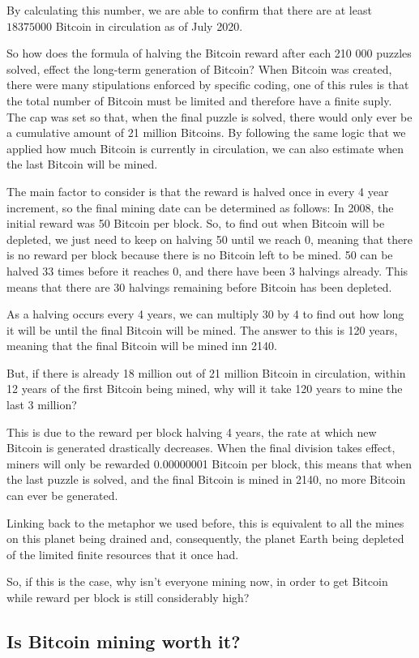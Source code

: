 \documentclass{article}
\begin{document}
 By calculating this number, we are able to confirm that there are at least \(18 375 000\) Bitcoin in circulation as of July 2020.
 
 So how does the formula of halving the Bitcoin reward after each 210 000 puzzles solved, effect the long-term generation of Bitcoin?
 When Bitcoin was created, there were many stipulations enforced by specific coding, one of this rules is that the total number of Bitcoin must be limited and therefore have a finite suply. The cap was set so that, when the final puzzle is solved, there would only ever be a cumulative amount of 21 million Bitcoins. By following the same logic that we applied how much Bitcoin is currently in circulation, we can also estimate when the last Bitcoin will be mined.
 
 The main factor to consider is that the reward is halved once in every 4 year increment, so the final mining date can be determined as follows: In 2008, the initial reward was 50 Bitcoin per block. So, to find out when Bitcoin will be depleted, we just need to keep on halving 50 until we reach 0, meaning that there is no reward per block because there is no Bitcoin left to be mined. 50 can be halved 33 times before it reaches 0, and there have been 3 halvings already. This means that there are 30 halvings remaining before Bitcoin has been depleted.
 
 As a halving occurs every 4 years, we can multiply 30 by 4 to find out how long it will be until the final Bitcoin will be mined. The answer to this is 120 years, meaning that the final Bitcoin will be mined inn 2140.
 
 But, if there is already 18 million out of 21 million Bitcoin in circulation, within 12 years of the first Bitcoin being mined, why will it take 120 years to mine the last 3 million?
 
 This is due to the reward per block halving 4 years, the rate at which new Bitcoin is generated drastically decreases. When the final division takes effect, miners will only be rewarded 0.00000001 Bitcoin per block, this means that when the last puzzle is solved, and the final Bitcoin is mined in 2140, no more Bitcoin can ever be generated.
 
 Linking back to the metaphor we used before, this is equivalent to all the mines on this planet being drained and, consequently, the planet Earth being depleted of the limited finite resources that it once had.
 
 So, if this is the case, why isn't everyone mining now, in order to get Bitcoin while reward per block is still considerably high?
 
 

 
 \subsection{Is Bitcoin mining worth it?}
 
 
 
 
 
 





\nocite{*}
\printbibliography
\end{document}
